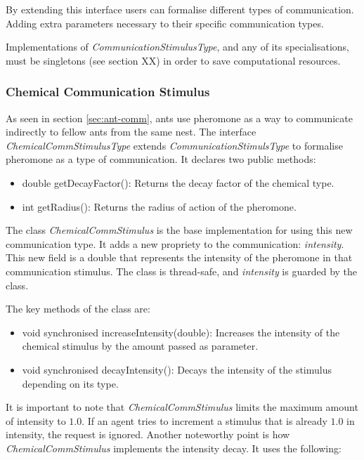 By extending this interface users can formalise different types of communication. Adding extra parameters necessary to their specific communication types.

Implementations of \emph{CommunicationStimulusType}, and any of its specialisations, must be singletons (see section XX) in order to save computational resources.

\subsubsection{Chemical Communication Stimulus}
\label{subsec:chemical-stimulus}

As seen in section \ref{sec:ant-comm}, ants use pheromone as a way to communicate indirectly to fellow ants from the same nest. The interface \emph{ChemicalCommStimulusType} extends \emph{CommunicationStimulsType} to formalise pheromone as a type of communication. It declares two public methods:

\begin{itemize}
  \item double getDecayFactor(): Returns the decay factor of the chemical type. 
  \item int getRadius(): Returns the radius of action of the pheromone.
\end{itemize}

The class \emph{ChemicalCommStimulus} is the base implementation for using this new communication type. It adds a new propriety to the communication: \emph{intensity}. This new field is a double that represents the intensity of the pheromone in that communication stimulus. The class is thread-safe, and \emph{intensity} is guarded by the class.

The key methods of the class are:

\begin{itemize}
  \item void synchronised increaseIntensity(double): Increases the intensity of the chemical stimulus by the amount passed as parameter.
  
  \item void synchronised decayIntensity(): Decays the intensity of the stimulus depending on its type.
\end{itemize}

It is important to note that \emph{ChemicalCommStimulus} limits the maximum amount of intensity to $1.0$. If an agent tries to increment a stimulus that is already $1.0$ in intensity, the request is ignored.
Another noteworthy point is how \emph{ChemicalCommStimulus} implements the intensity decay. It uses the following:

